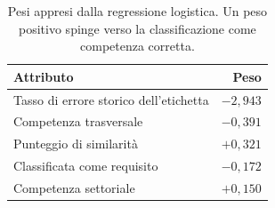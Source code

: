 \begin{table}[htbp]
  \centering
  \caption{Pesi appresi dalla regressione logistica. Un peso positivo spinge
           verso la classificazione come competenza corretta.}
  \label{tab:pesi}
  \begin{tabular}{lr}
    \toprule
    \textbf{Attributo} & \textbf{Peso} \\
    \midrule
    Tasso di errore storico dell'etichetta & $-2{,}943$ \\
    Competenza trasversale                 & $-0{,}391$ \\
    Punteggio di similarità                & $+0{,}321$ \\
    Classificata come requisito            & $-0{,}172$ \\
    Competenza settoriale                  & $+0{,}150$ \\
    \bottomrule
  \end{tabular}
\end{table}
